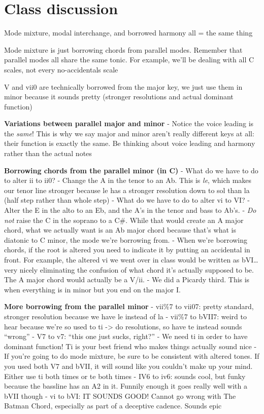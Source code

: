 \documentclass{book}
\begin{document}
\hypertarget{class-discussion-18}{%
\chapter{Class discussion}\label{class-discussion-18}}

Mode mixture, modal interchange, and borrowed harmony all = the same thing

Mode mixture is just borrowing chords from parallel modes. Remember that
parallel modes all share the same tonic. For example, we'll be dealing with
all C scales, not every no-accidentals scale

V and vii0 are technically borrowed from the major key, we just use them in
minor because it sounds pretty (stronger resolutions and actual dominant
function)

\textbf{Variations between parallel major and minor} - Notice the voice
leading is the \emph{same}! This is why we say major and minor aren't really
different keys at all: their function is exactly the same. Be thinking about
voice leading and harmony rather than the actual notes

\textbf{Borrowing chords from the parallel minor (in C)} - What do we have to
do to alter ii to ii0? - Change the A in the tenor to an Ab. This is
\emph{le}, which makes our tenor line stronger because le has a stronger
resolution down to sol than la (half step rather than whole step) - What do we
have to do to alter vi to VI? - Alter the E in the alto to an Eb, and the A's
in the tenor and bass to Ab's. - \emph{Do not} raise the C in the soprano to a
C\#. While that would create an A major chord, what we actually want is an Ab
major chord because that's what is diatonic to C minor, the mode we're
borrowing from. - When we're borrowing chords, if the root is altered you need
to indicate it by putting an accidental in front. For example, the altered vi
we went over in class would be written as bVI\ldots very nicely eliminating
the confusion of what chord it's actually supposed to be. The A major chord
would actually be a V/ii. - We did a Picardy third. This is when everything is
in minor but you end on the major I.

\textbf{More borrowing from the parallel minor} - vii\%7 to vii07: pretty
standard, stronger resolution because we have le instead of la - vii\%7 to
bVII7: weird to hear because we're so used to ti -\textgreater{} do
resolutions, so have te instead sounds ``wrong'' - V7 to v7: ``this one just
sucks, right?'' - We need ti in order to have dominant function! Ti is your
best friend who makes things actually sound nice - If you're going to do mode
mixture, be sure to be consistent with altered tones. If you used both V7 and
bVII, it will sound like you couldn't make up your mind. Either use ti both
times or te both times - IV6 to iv6: sounds cool, but funky because the
bassline has an A2 in it. Funnily enough it goes really well with a bVII
though - vi to bVI: IT SOUNDS GOOD! Cannot go wrong with The Batman Chord,
especially as part of a deceptive cadence. Sounds epic
\end{document}
